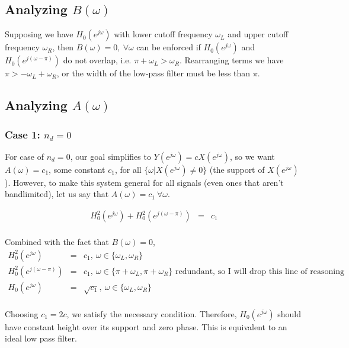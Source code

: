 \documentclass[11pt]{article}
\begin{document}
\subsection*{Analyzing $B(\omega)$}

Supposing we have $H_0(e^{j\omega})$ with lower cutoff frequency $\omega_L$ and upper cutoff frequency $\omega_R$, then $B(\omega) = 0,\ \forall \omega$ can be enforced if $ H_0(e^{j\omega})$ and $H_0(e^{j(\omega-\pi)}) $ do not overlap, i.e. $\pi + \omega_L > \omega_R$. Rearranging terms we have $\pi > -\omega_L+\omega_R$, or the width of the low-pass filter must be less than $\pi$.

\subsection*{Analyzing $A(\omega)$}

\subsubsection*{Case 1: $n_d = 0$}

For case of $n_d = 0$, our goal simplifies to $Y(e^{j\omega}) = c X(e^{j\omega})$, so we want $A(\omega) = c_1$, some constant $c_1$, for all $\{\omega | X(e^{j \omega}) \neq 0\}$ (the support of $X(e^{j \omega})$). However, to make this system general for all signals (even ones that aren't bandlimited), let us say that $A(\omega) = c_1 \ \forall \omega$.

\begin{eqnarray*}
H_0^2(e^{j\omega})+H_0^2(e^{j(\omega-\pi)}) &=& c_1 \\
\end{eqnarray*}

Combined with the fact that $ B(\omega)=0$, 
\begin{eqnarray*}
H_0^2(e^{j\omega}) &=& c_1,\ \omega \in \{\omega_L,\omega_R\} \\
H_0^2(e^{j(\omega-\pi)}) &=& c_1,\ \omega \in \{\pi+\omega_L,\pi+\omega_R\} \text{ redundant, so I will drop this line of reasoning}\\
H_0(e^{j\omega}) &=& \sqrt{c_1},\ \omega \in \{\omega_L,\omega_R\} \\
\end{eqnarray*}

Choosing $c_1 = 2c$, we satisfy the necessary condition. Therefore, $H_0(e^{j\omega})$ should have constant height over its support and zero phase. This is equivalent to an ideal low pass filter.
\end{document}
